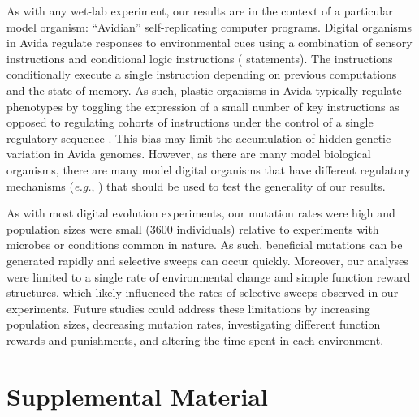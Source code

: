 \documentclass[utf8]{frontiersSCNS} %
\begin{document}
\begin{raggedbottom}
As with any wet-lab experiment, our results are in the context of a particular model organism: ``Avidian'' self-replicating computer programs.
Digital organisms in Avida regulate responses to environmental cues using a combination of sensory instructions and conditional logic instructions ( statements).
The  instructions conditionally execute a single instruction depending on previous computations and the state of memory.
As such, plastic organisms in Avida typically regulate phenotypes by toggling the expression of a small number of key instructions as opposed to regulating cohorts of instructions under the control of a single regulatory sequence \citep{supplemental_material}.
This bias may limit the accumulation of hidden genetic variation in Avida genomes.
However, as there are many model biological organisms, there are many model digital organisms that have different regulatory mechanisms (\textit{e.g.}, \citealt{lalejini_evolving_2018}) that should be used to test the generality of our results.

As with most digital evolution experiments, our mutation rates were high and population sizes were small (3600 individuals) relative to experiments with microbes or conditions common in nature.
As such, beneficial mutations can be generated rapidly and selective sweeps can occur quickly.
Moreover, our analyses were limited to a single rate of environmental change and simple function reward structures, which likely influenced the rates of selective sweeps observed in our experiments. 
Future studies could address these limitations by increasing population sizes, decreasing mutation rates, investigating different function rewards and punishments, and altering the time spent in each environment. %


\end{raggedbottom}

\section*{Supplemental Material}
\end{document}
